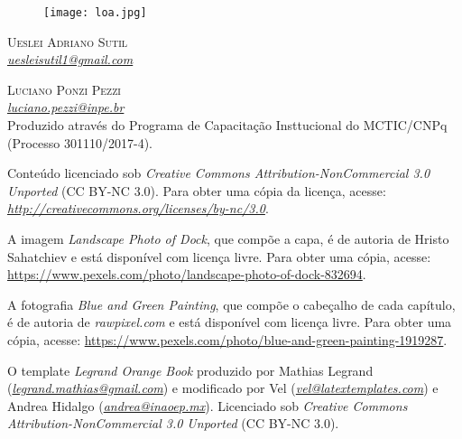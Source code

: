 \newpage
\thispagestyle{empty}

\begin{figure}[H]
    \centering
    \vspace*{\fill}
    \texttt{[image: loa.jpg]}
    \vspace{2cm}
\end{figure}


\noindent \textsc{Ueslei Adriano Sutil} 
\\
\noindent \textcolor{bleu_cite}{\href{uesleisutil1@gmail.com}{\textit{uesleisutil1@gmail.com}}}  %
\bigskip

\noindent \textsc{Luciano Ponzi Pezzi}
\\
\noindent \textcolor{bleu_cite}{\href{luciano.pezzi@inpe.br}{\textit{luciano.pezzi@inpe.br}}}  %
\bigskip
\\

\noindent Produzido através do Programa de Capacitação Insttucional do MCTIC/CNPq (Processo 301110/2017-4). 
\bigskip

\noindent Conteúdo licenciado sob \textit{Creative Commons Attribution-NonCommercial 3.0 Unported} (CC BY-NC 3.0).
          Para obter uma cópia da licença, acesse: \textcolor{bleu_cite}{\href{http://creativecommons.org/licenses/by-nc/3.0}{\textit{http://creativecommons.org/licenses/by-nc/3.0}}}. 
\bigskip

\noindent A imagem \textit{Landscape Photo of Dock}, que compõe a capa, é de autoria de Hristo Sahatchiev e está disponível com licença livre. Para obter uma cópia, acesse: \textcolor{bleu_cite}{\href{https://www.pexels.com/photo/landscape-photo-of-dock-832694}{https://www.pexels.com/photo/landscape-photo-of-dock-832694}}. \
\bigskip

\noindent A fotografia \textit{Blue and Green Painting}, que compõe o cabeçalho de cada capítulo, é de autoria de  \textit{rawpixel.com} e está disponível com licença livre. Para obter uma cópia, acesse: \textcolor{bleu_cite}{\href{https://www.pexels.com/photo/blue-and-green-painting-1919287}{https://www.pexels.com/photo/blue-and-green-painting-1919287}}.  \\
\bigskip

\noindent O template \textit{Legrand Orange Book} produzido por Mathias Legrand 
          (\textcolor{bleu_cite}{\href{legrand.mathias@gmail.com}{\textit{legrand.mathias@gmail.com}}}) e modificado por 
          Vel (\textcolor{bleu_cite}{\href{vel@latextemplates.com}{\textit{vel@latextemplates.com}}}) e Andrea Hidalgo (\textcolor{bleu_cite}{\href{andrea@inaoep.mx}{\textit{andrea@inaoep.mx}}}). Licenciado sob \textit{Creative Commons Attribution-NonCommercial 3.0 Unported} (CC BY-NC 3.0).\\
\bigskip

